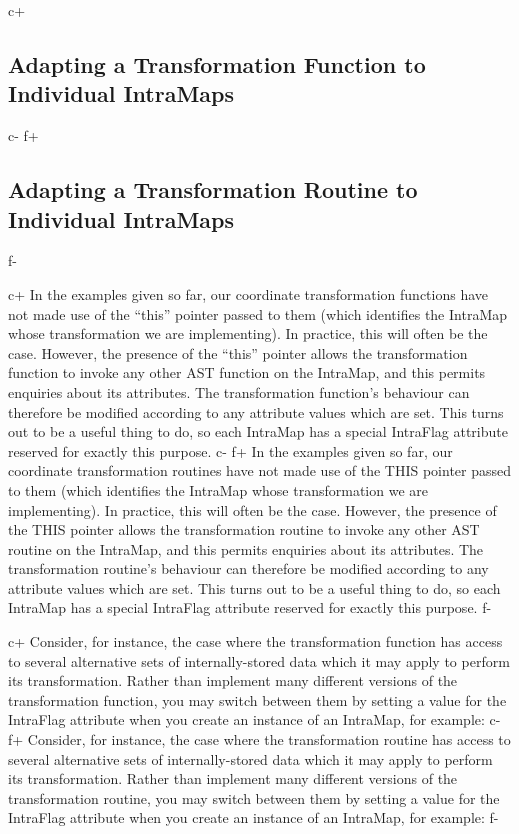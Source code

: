 \documentclass[twoside,11pt]{starlink}
\begin{document}
c+
\subsection{\label{ss:intraflag}Adapting a Transformation Function to Individual IntraMaps}
c-
f+
\subsection{\label{ss:intraflag}Adapting a Transformation Routine to Individual IntraMaps}
f-

c+
In the examples given so far, our coordinate transformation functions
have not made use of the ``this'' pointer passed to them (which
identifies the IntraMap whose transformation we are implementing). In
practice, this will often be the case. However, the presence of the
``this'' pointer allows the transformation function to invoke any
other AST function on the IntraMap, and this permits enquiries about
its attributes. The transformation function's behaviour can therefore
be modified according to any attribute values which are set. This
turns out to be a useful thing to do, so each IntraMap has a special
IntraFlag attribute reserved for exactly this purpose.
c-
f+
In the examples given so far, our coordinate transformation routines
have not made use of the THIS pointer passed to them (which identifies
the IntraMap whose transformation we are implementing). In practice,
this will often be the case. However, the presence of the THIS pointer
allows the transformation routine to invoke any other AST routine on
the IntraMap, and this permits enquiries about its attributes. The
transformation routine's behaviour can therefore be modified according
to any attribute values which are set. This turns out to be a useful
thing to do, so each IntraMap has a special IntraFlag attribute reserved
for exactly this purpose.
f-

c+
Consider, for instance, the case where the transformation function has
access to several alternative sets of internally-stored data which it
may apply to perform its transformation. Rather than implement many
different versions of the transformation function, you may switch
between them by setting a value for the IntraFlag attribute when you
create an instance of an IntraMap, for example:
c-
f+
Consider, for instance, the case where the transformation routine has
access to several alternative sets of internally-stored data which it
may apply to perform its transformation. Rather than implement many
different versions of the transformation routine, you may switch
between them by setting a value for the IntraFlag attribute when you
create an instance of an IntraMap, for example:
f-
\end{document}
